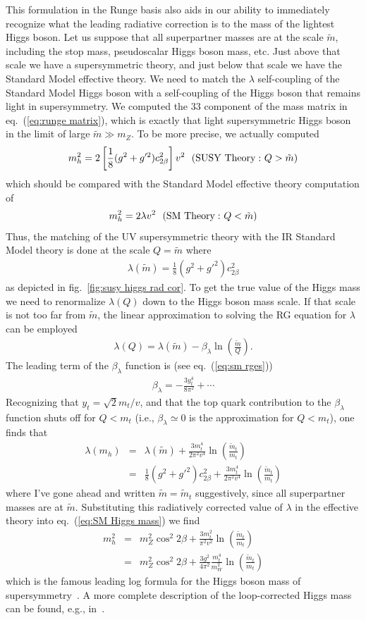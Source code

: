\documentclass[12pt]{article}
\def\beq{\begin{eqnarray}}
\def\eeq{\end{eqnarray}}
\def\bea{\begin{eqnarray}}
\def\eea{\end{eqnarray}}
\def\eq#1{eq.~(\ref{#1})}
\begin{document}
This formulation in the Runge basis also aids in our ability to immediately recognize what the leading radiative correction is to the mass of the lightest Higgs boson.  Let us suppose that all superpartner masses are at the scale $\tilde m$, including the stop mass, pseudoscalar Higgs boson mass, etc. Just above that scale we have a supersymmetric theory, and just below that scale we have the Standard Model effective theory.  We need to match the $\lambda$ self-coupling of the Standard Model Higgs boson with a self-coupling of the Higgs boson that remains light in supersymmetry. We computed the  $33$ component of the mass matrix in \eq{eq:runge matrix}, which is exactly that light supersymmetric Higgs boson in the limit of large $\tilde m\gg m_Z$. To be more precise, we actually computed
\beq
m^2_{h}=2\left[\frac{1}{8}(g^2+g'^2)c^2_{2\beta}\right] v^2 ~~{\rm (SUSY~Theory:~}Q>\tilde m)
\eeq
which should be compared with the Standard Model effective theory computation of 
\beq
m^2_h=2\lambda v^2 ~~{\rm (SM~Theory:~}Q<\tilde m)
\label{eq:SM Higgs mass}
\eeq
Thus, the matching of the UV supersymmetric theory with the IR Standard Model theory is done at the scale $Q=\tilde m$ where
\beq
\lambda(\tilde m)=\frac{1}{8}(g^2+g'^2)c^2_{2\beta}
\eeq
as depicted in fig.~\ref{fig:susy higgs rad cor}.
To get the true value of the Higgs mass we need to renormalize $\lambda(Q)$ down to the Higgs boson mass scale. If that scale is not too far from $\tilde m$, the linear approximation to solving the RG equation for $\lambda$ can be employed
\beq
\lambda(Q)=\lambda(\tilde m)-\beta_\lambda \ln\left( \frac{\tilde m}{ Q}\right).
\eeq
The leading term of the $\beta_\lambda$ function is (see \eq{eq:sm rges})
\beq
\beta_\lambda = -\frac{3y_t^4}{8\pi^2}+\cdots
\eeq
Recognizing that $y_t=\sqrt{2}m_t/v$, and that the top quark  contribution to the $\beta_\lambda$ function shuts off for $Q<m_t$ (i.e., $\beta_\lambda\simeq 0$ is the approximation for $Q<m_t$), one finds that
\bea
\lambda(m_h)& = &\lambda(\tilde m)+\frac{3m_t^4}{2\pi^2 v^4}\ln\left( \frac{\tilde m_t}{m_t}\right) \nonumber \\
& = & \frac{1}{8}(g^2+g'^2)c^2_{2\beta}+\frac{3m_t^4}{2\pi^2 v^4}\ln\left( \frac{\tilde m_t}{ m_t}\right) 
\eea
where I've gone ahead and written $\tilde m=\tilde m_t$ suggestively, since all superpartner masses are at $\tilde m$. Substituting this radiatively corrected value of $\lambda$ in the effective theory into \eq{eq:SM Higgs mass} we find
\bea
m^2_h & = & m^2_Z\cos^2 2\beta+\frac{3m^2_t}{\pi^2 v^2} \ln\left( \frac{\tilde m_t}{m_t}\right) \nonumber \\
&=& m^2_Z\cos^2 2\beta+\frac{3g^2}{4\pi^2}\frac{m^4_t}{m^2_W}\ln\left( \frac{\tilde m_t}{m_t}\right) 
\label{eq:leading rad}
\eea
which is the famous leading log formula for the Higgs boson mass of 
supersymmetry~\cite{Haber:1990aw,Okada:1990vk,Ellis:1990nz}. A more complete description of the loop-corrected Higgs mass can be found, e.g., in~\cite{Carena:2002es}. 
\end{document}
